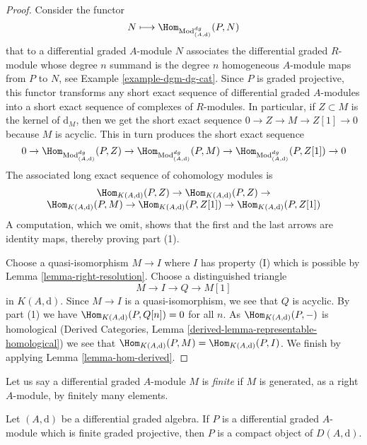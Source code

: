 \begin{proof}
Consider the functor
$$
N \longmapsto \Hom_{\text{Mod}_{(A, \text{d})}^{dg}}(P, N)
$$
that to a differential graded $A$-module $N$ associates the differential
graded $R$-module whose degree $n$ summand is the degree $n$ homogeneous
$A$-module maps from $P$ to $N$, see
Example \ref{example-dgm-dg-cat}.
Since $P$ is graded projective, this functor transforms any short
exact sequence of differential graded $A$-modules into a short
exact sequence of complexes of $R$-modules. In particular, if
$Z \subset M$ is the kernel of $\text{d}_M$, then we get the
short exact sequence $0 \to Z \to M \to Z[1] \to 0$ because
$M$ is acyclic. This in turn produces the short exact sequence
$$
0 \to \Hom_{\text{Mod}_{(A, \text{d})}^{dg}}(P, Z) \to
\Hom_{\text{Mod}_{(A, \text{d})}^{dg}}(P, M) \to 
\Hom_{\text{Mod}_{(A, \text{d})}^{dg}}(P, Z[1]) \to 0
$$
The associated long exact sequence of cohomology modules is
$$
\begin{matrix}
\Hom_{K(A, \text{d})}(P, Z) \to
\Hom_{K(A, \text{d})}(P, Z) \to \\
\Hom_{K(A, \text{d})}(P, M) \to
\Hom_{K(A, \text{d})}(P, Z[1]) \to
\Hom_{K(A, \text{d})}(P, Z[1])
\end{matrix}
$$
A computation, which we omit, shows that the first and the last
arrows are identity maps, thereby proving part (1).

\medskip\noindent
Choose a quasi-isomorphism $M \to I$ where $I$ has property (I)
which is possible by Lemma \ref{lemma-right-resolution}.
Choose a distinguished triangle
$$
M \to I \to Q \to M[1]
$$
in $K(A, \text{d})$. Since $M \to I$ is a quasi-isomorphism, we see
that $Q$ is acyclic. By part (1) we have
$\Hom_{K(A, \text{d})}(P, Q[n]) = 0$ for all $n$.
As $\Hom_{K(A, \text{d})}(P, -)$ is homological
(Derived Categories, Lemma \ref{derived-lemma-representable-homological})
we see that $\Hom_{K(A, \text{d})}(P, M) = \Hom_{K(A, \text{d})}(P, I)$.
We finish by applying Lemma \ref{lemma-hom-derived}.
\end{proof}

\noindent
Let us say a differential graded $A$-module $M$ is {\it finite}
if $M$ is generated, as a right $A$-module, by finitely many
elements.

\begin{lemma}
\label{lemma-graded-projective-is-compact}
Let $(A, \text{d})$ be a differential graded algebra. If $P$ is a
differential graded $A$-module which is finite graded projective,
then $P$ is a compact object of $D(A, \text{d})$.
\end{lemma}

